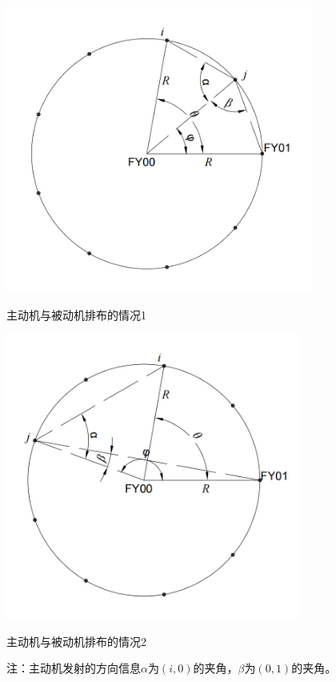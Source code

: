 \documentclass[withoutpreface,bwprint]{cumcmthesis} %
\begin{document}
\begin{figure}[H]
    \centering
    \begin{minipage}{0.49\textwidth}
        \centering
        \includegraphics[width=0.9\textwidth]{../../figure/q1_1.png} 
        \caption{主动机与被动机排布的情况1}
        \label{q1_1}
    \end{minipage}
    \begin{minipage}{0.49\textwidth}
        \centering
        \includegraphics[width=0.86\textwidth]{../../figure/q1_2.png} 
        \caption{主动机与被动机排布的情况2}
        \label{q1_2}   
    \end{minipage}
    \caption*{\small 注：主动机发射的方向信息$\alpha$为$(i,0)$的夹角，$\beta$为$(0,1)$的夹角。}
\end{figure}
\end{document}

